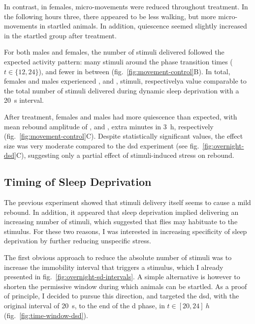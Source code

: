 In contrast, in females, micro-movements were reduced throughout treatment.
In the following hours three, there appeared to be less walking, but more micro-movements in startled animals.
In addition, quiescence seemed slightly increased in the startled group after treatment.


For both males and females, the number of stimuli delivered followed the expected activity pattern:
many stimuli around the phase transition times ($t \in \{12, 24\}$), and fewer in between (fig.~\ref{fig:movement-control}B).
In total, females and males experienced
, and
,
stimuli,
respectively\emd{}a value comparable to the total number of stimuli delivered during dynamic sleep deprivation with a 20~s interval.


After treatment, females and males had more quiescence than expected, with mean rebound amplitude of
, and
, extra minutes in 3~h, respectively (fig.~\ref{fig:movement-control}C).
Despite statistically significant values, the effect size was very moderate compared to the \gls{dsd} experiment (see fig.~\ref{fig:overnight-dsd}C), suggesting only a partial effect of stimuli-induced stress on rebound.

\subsection{Timing of Sleep Deprivation}

The previous experiment showed that stimuli delivery itself seems to cause a mild rebound.
In addition, it appeared that sleep deprivation implied delivering an increasing number of stimuli, which suggested that flies may habituate to the stimulus.
For these two reasons, I was interested in increasing specificity of sleep deprivation by further reducing unspecific stress.

The first obvious approach to reduce the absolute number of stimuli was to increase the immobility interval that triggers a stimulus, which I already presented in fig.~\ref{fig:overnight-sd-intervals}.
A simple alternative is however to shorten the permissive window during which animals can be startled.
As a proof of principle, I decided to pursue this direction, and targeted the \gls{dsd}, with the original interval of 20~s, to the end of the \gls{d} phase, in $t \in [20,24]~h$ (fig.~\ref{fig:time-window-dsd}).



